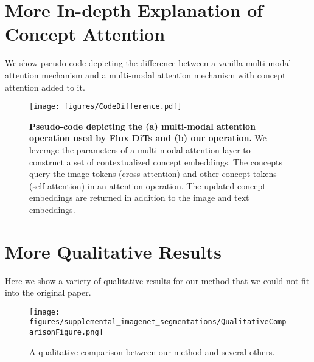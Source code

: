 \newpage
\appendix
\onecolumn

\section{More In-depth Explanation of Concept Attention}

We show pseudo-code depicting the difference between a vanilla multi-modal attention mechanism and a multi-modal attention mechanism with concept attention added to it. 

\begin{figure*}[h!]
    \centering
    \texttt{[image: figures/CodeDifference.pdf]}
    \vspace{-0.3in}
    \caption{\textbf{Pseudo-code depicting the (a) multi-modal attention operation used by Flux DiTs and (b) our \tool{} operation.} We leverage the parameters of a multi-modal attention layer to construct a set of contextualized concept embeddings. The concepts query the image tokens (cross-attention) and other concept tokens (self-attention) in an attention operation. The updated concept embeddings are returned in addition to the image and text embeddings. }
    \label{fig:concept_attention_code}
\end{figure*}

\newpage
\section{More Qualitative Results}
\label{QualitativeAppendix}

Here we show a variety of qualitative results for our method that we could not fit into the original paper. 

\begin{figure*}[h!]
    \centering
    \texttt{[image: figures/supplemental\_imagenet\_segmentations/QualitativeComparisonFigure.png]}
    \vspace{-0.2in}
    \caption{A qualitative comparison between our method and several others. }
    \label{fig:enter-label}
\end{figure*}

